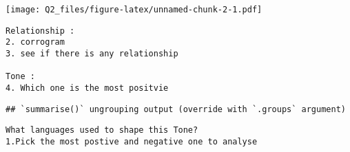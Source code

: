 \documentclass[
]{article}
\newenvironment{Shaded}{\begin{snugshade}}{\end{snugshade}}
\newcommand{\DataTypeTok}[1]{\textcolor[rgb]{0.13,0.29,0.53}{#1}}
\newcommand{\DecValTok}[1]{\textcolor[rgb]{0.00,0.00,0.81}{#1}}
\newcommand{\KeywordTok}[1]{\textcolor[rgb]{0.13,0.29,0.53}{\textbf{#1}}}
\newcommand{\NormalTok}[1]{#1}
\newcommand{\OperatorTok}[1]{\textcolor[rgb]{0.81,0.36,0.00}{\textbf{#1}}}
\newcommand{\StringTok}[1]{\textcolor[rgb]{0.31,0.60,0.02}{#1}}
\begin{document}
\texttt{[image: Q2\_files/figure-latex/unnamed-chunk-2-1.pdf]}

\begin{verbatim}
Relationship :
2. corrogram 
3. see if there is any relationship

Tone : 
4. Which one is the most positvie
\end{verbatim}

\begin{Shaded}
\end{Shaded}

\begin{verbatim}
## `summarise()` ungrouping output (override with `.groups` argument)
\end{verbatim}

\begin{Shaded}
\end{Shaded}

\begin{verbatim}
What languages used to shape this Tone?
1.Pick the most postive and negative one to analyse 
\end{verbatim}
\end{document}
